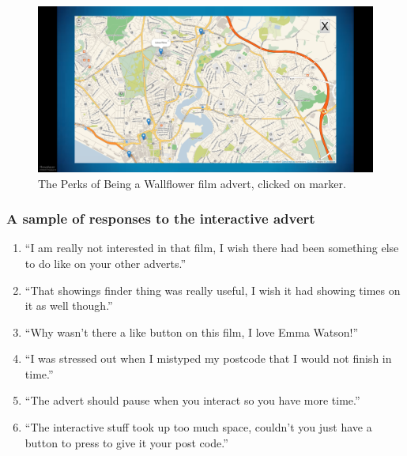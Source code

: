 	\begin{figure}[th]
		\centering
		\includegraphics[width=\textwidth,height=0.5\textheight,keepaspectratio]{images/adverts/wallflower-4.png}
		\caption{The Perks of Being a Wallflower film advert, clicked on marker.}
		\label{fig:wallflower4}
	\end{figure}

	\subsubsection*{A sample of responses to the interactive advert}
	\begin{enumerate}
		\item{``I am really not interested in that film, I wish there had been something else to do like on your other adverts.''}
		\item{``That showings finder thing was really useful, I wish it had showing times on it as well though.''}
		\item{``Why wasn't there a like button on this film, I love Emma Watson!''}
		\item{``I was stressed out when I mistyped my postcode that I would not finish in time.''}
		\item{``The advert should pause when you interact so you have more time.''}
		\item{``The interactive stuff took up too much space, couldn't you just have a button to press to give it your post code.''}
	\end{enumerate}

\clearpage
